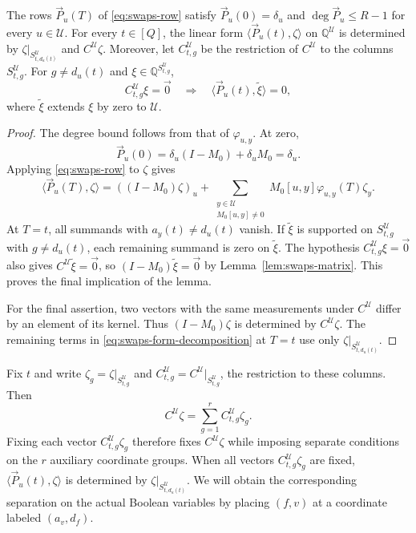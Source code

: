 \begin{lemma}\label{lem:swaps-forms}
The rows $\vec P_u(T)$ of \eqref{eq:swaps-row} satisfy
$\vec P_u(0)=\delta_u$ and $\deg\vec P_u\le R-1$ for every
$u\in\mathcal U$. For every $t\in[Q]$, the linear form
$\langle\vec P_u(t),\zeta\rangle$ on $\mathbb Q^{\mathcal U}$ is
determined by $\zeta|_{S^{\mathcal U}_{t,d_u(t)}}$ and
$C^{\mathcal U}\zeta$. Moreover, let $C^{\mathcal U}_{t,g}$ be the
restriction of $C^{\mathcal U}$ to the columns $S^{\mathcal U}_{t,g}$.
For $g\ne d_u(t)$ and $\xi\in\mathbb Q^{S^{\mathcal U}_{t,g}}$,
\[
 C^{\mathcal U}_{t,g}\xi=\vec0
 \quad\Longrightarrow\quad
 \langle\vec P_u(t),\widetilde\xi\rangle=0,
\]
where $\widetilde\xi$ extends $\xi$ by zero to $\mathcal U$.
\end{lemma}
\begin{proof}
The degree bound follows from that of $\varphi_{u,y}$. At zero,
\[
 \vec{P}_u(0)=\delta_u(I-M_0)+\delta_uM_0=\delta_u.
\]
Applying \eqref{eq:swaps-row} to $\zeta$ gives
\begin{equation}\label{eq:swaps-form-decomposition}
 \langle \vec{P}_u(T), \zeta\rangle=((I-M_0)\zeta)_u+
 \sum_{\substack{y\in\mathcal U\\M_0[u,y]\ne0}}
 M_0[u,y]\varphi_{u,y}(T)\zeta_y.
\end{equation}
At $T=t$, all summands with $a_y(t)\ne d_u(t)$ vanish. If
$\widetilde\xi$ is supported on $S^{\mathcal U}_{t,g}$ with
$g\ne d_u(t)$, each remaining summand is zero on $\widetilde\xi$.
The hypothesis $C^{\mathcal U}_{t,g}\xi=\vec{0}$ also gives
$C^{\mathcal U}\widetilde\xi=\vec{0}$, so
$(I-M_0)\widetilde\xi=\vec{0}$ by Lemma~\ref{lem:swaps-matrix}.
This proves the final implication of the lemma.

For the final assertion, two vectors with the same measurements under
$C^{\mathcal U}$ differ by an element of its kernel. Thus
$(I-M_0)\zeta$ is determined by $C^{\mathcal U}\zeta$. The remaining
terms in \eqref{eq:swaps-form-decomposition} at $T=t$ use only
$\zeta|_{S^{\mathcal U}_{t,d_u(t)}}$.
\end{proof}

Fix $t$ and write $\zeta_g=\zeta|_{S^{\mathcal U}_{t,g}}$ and
$C^{\mathcal U}_{t,g}=C^{\mathcal U}|_{S^{\mathcal U}_{t,g}}$,
the restriction to these columns. Then
\begin{equation}\label{eq:auxiliary-measurements}
 C^{\mathcal U}\zeta=\sum_{g=1}^r C^{\mathcal U}_{t,g}\zeta_g.
\end{equation}
Fixing each vector $C^{\mathcal U}_{t,g}\zeta_g$ therefore fixes
$C^{\mathcal U}\zeta$ while imposing separate conditions on the
$r$ auxiliary coordinate groups. When all vectors
$C^{\mathcal U}_{t,g}\zeta_g$ are fixed, $\langle \vec{P}_u(t), \zeta\rangle$ is determined
by $\zeta|_{S^{\mathcal U}_{t,d_u(t)}}$.
We will obtain the corresponding separation on the actual Boolean
variables by placing $(f,v)$ at a coordinate labeled $(a_v,d_f)$.


